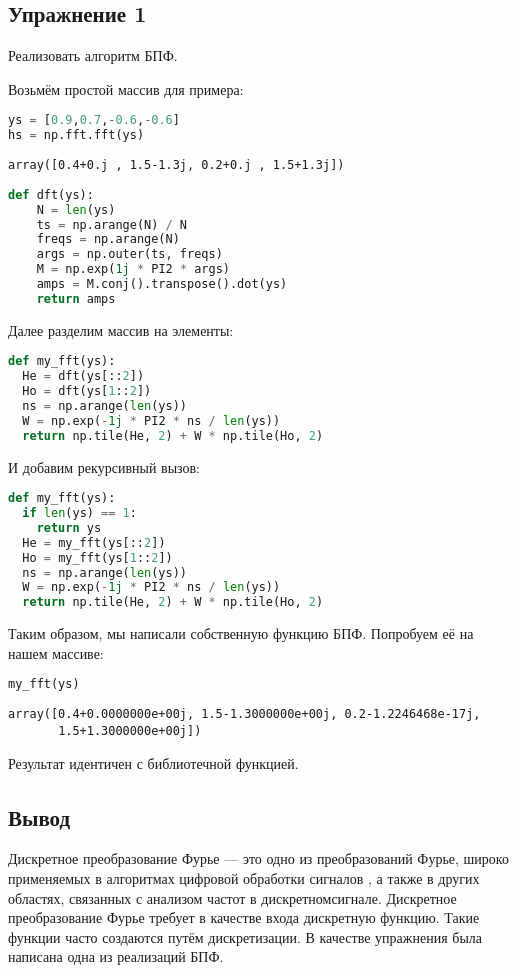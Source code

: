 \subsection{Упражнение 1}

Реализовать алгоритм БПФ.

Возьмём простой массив для примера:

\begin{lstlisting}[language=Python]
ys = [0.9,0.7,-0.6,-0.6]
hs = np.fft.fft(ys)
\end{lstlisting}
\begin{lstlisting}
array([0.4+0.j , 1.5-1.3j, 0.2+0.j , 1.5+1.3j])
\end{lstlisting}

\begin{lstlisting}[language=Python]
def dft(ys):
    N = len(ys)
    ts = np.arange(N) / N
    freqs = np.arange(N)
    args = np.outer(ts, freqs)
    M = np.exp(1j * PI2 * args)
    amps = M.conj().transpose().dot(ys)
    return amps
\end{lstlisting}

Далее разделим массив на элементы:

\begin{lstlisting}[language=Python]
def my_fft(ys):
  He = dft(ys[::2])
  Ho = dft(ys[1::2])
  ns = np.arange(len(ys))
  W = np.exp(-1j * PI2 * ns / len(ys))
  return np.tile(He, 2) + W * np.tile(Ho, 2)
\end{lstlisting}

И добавим рекурсивный вызов:

\begin{lstlisting}[language=Python]
def my_fft(ys):
  if len(ys) == 1:
    return ys
  He = my_fft(ys[::2])
  Ho = my_fft(ys[1::2])
  ns = np.arange(len(ys))
  W = np.exp(-1j * PI2 * ns / len(ys))
  return np.tile(He, 2) + W * np.tile(Ho, 2)
\end{lstlisting}

Таким образом, мы написали собственную функцию БПФ. Попробуем её на нашем массиве:

\begin{lstlisting}[language=Python]
my_fft(ys)
\end{lstlisting}
\begin{lstlisting}
array([0.4+0.0000000e+00j, 1.5-1.3000000e+00j, 0.2-1.2246468e-17j,
       1.5+1.3000000e+00j])
\end{lstlisting}

Результат идентичен с библиотечной функцией.

\subsection{Вывод}

Дискретное преобразование Фурье  — это одно из преобразований Фурье, широко применяемых в алгоритмах цифровой обработки сигналов , а также в других областях, связанных с анализом частот в дискретномсигнале. Дискретное преобразование Фурье требует в качестве входа дискретную функцию. Такие функции часто создаются путём дискретизации. В качестве упражнения была написана одна из реализаций БПФ.